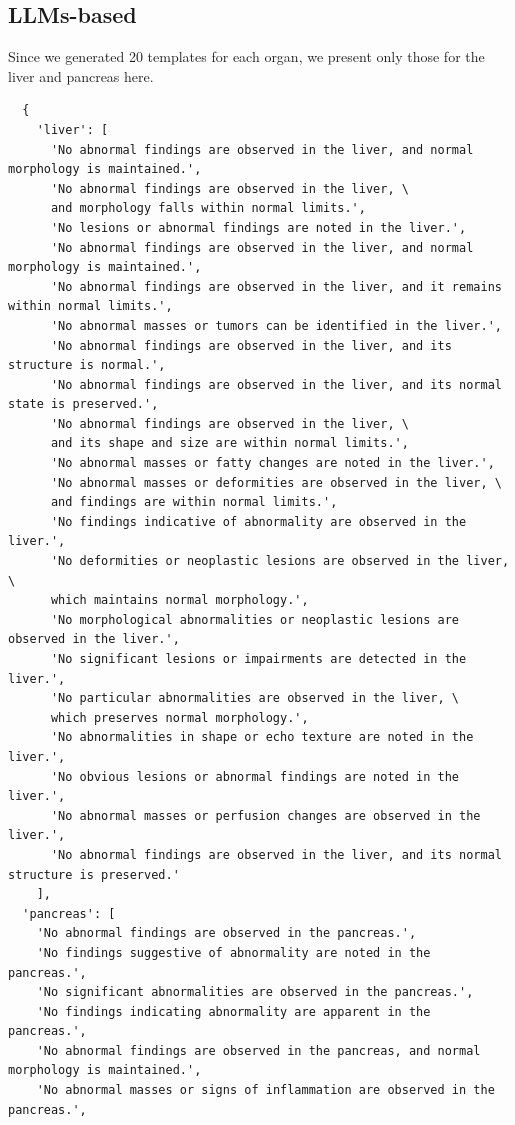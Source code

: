 \documentclass[bioengineering,article,submit,pdftex,moreauthors]{Definitions/mdpi}
\begin{document}
\subsection{LLMs-based}
Since we generated 20 templates for each organ, we present only those for the liver and pancreas here.
\begin{verbatim}
  {
    'liver': [
      'No abnormal findings are observed in the liver, and normal morphology is maintained.',
      'No abnormal findings are observed in the liver, \
      and morphology falls within normal limits.',
      'No lesions or abnormal findings are noted in the liver.',
      'No abnormal findings are observed in the liver, and normal morphology is maintained.',
      'No abnormal findings are observed in the liver, and it remains within normal limits.',
      'No abnormal masses or tumors can be identified in the liver.',
      'No abnormal findings are observed in the liver, and its structure is normal.',
      'No abnormal findings are observed in the liver, and its normal state is preserved.',
      'No abnormal findings are observed in the liver, \
      and its shape and size are within normal limits.',
      'No abnormal masses or fatty changes are noted in the liver.',
      'No abnormal masses or deformities are observed in the liver, \
      and findings are within normal limits.',
      'No findings indicative of abnormality are observed in the liver.',
      'No deformities or neoplastic lesions are observed in the liver, \
      which maintains normal morphology.',
      'No morphological abnormalities or neoplastic lesions are observed in the liver.',
      'No significant lesions or impairments are detected in the liver.',
      'No particular abnormalities are observed in the liver, \
      which preserves normal morphology.',
      'No abnormalities in shape or echo texture are noted in the liver.',
      'No obvious lesions or abnormal findings are noted in the liver.',
      'No abnormal masses or perfusion changes are observed in the liver.',
      'No abnormal findings are observed in the liver, and its normal structure is preserved.'
    ],
  'pancreas': [
    'No abnormal findings are observed in the pancreas.',
    'No findings suggestive of abnormality are noted in the pancreas.',
    'No significant abnormalities are observed in the pancreas.',
    'No findings indicating abnormality are apparent in the pancreas.',
    'No abnormal findings are observed in the pancreas, and normal morphology is maintained.',
    'No abnormal masses or signs of inflammation are observed in the pancreas.',

\end{verbatim}
\end{document}
